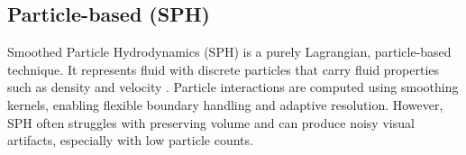 \subsection{Particle-based (SPH)}
Smoothed Particle Hydrodynamics (SPH) is a purely Lagrangian, particle-based technique.
It represents fluid with discrete particles that carry fluid properties such as density and velocity \citep{monaghan1992smoothed}.
Particle interactions are computed using smoothing kernels, enabling flexible boundary handling and adaptive resolution.
However, SPH often struggles with preserving volume and can produce noisy visual artifacts, especially with low particle counts.

